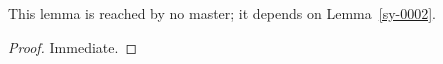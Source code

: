 
\begin{lemma}[Loose]\label{sy-0009}
This lemma is reached by no master; it depends on Lemma~\ref{sy-0002}.
\end{lemma}
\begin{proof}
Immediate.
\end{proof}
